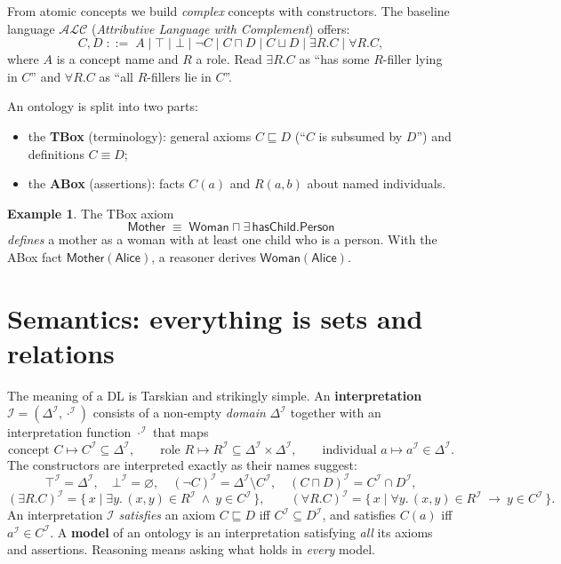 \documentclass[11pt]{article}
\newcommand{\I}{\mathcal{I}}                 %
\newcommand{\dom}{\Delta^{\I}}               %
\newcommand{\interp}[1]{#1^{\I}}             %
\newcommand{\concept}[1]{\ensuremath{\mathsf{#1}}}%
\newcommand{\role}[1]{\ensuremath{\mathsf{#1}}}   %
\newcommand{\dl}[1]{\ensuremath{\mathcal{#1}}}%
\newcommand{\sub}{\sqsubseteq}
\newcommand{\inter}{\sqcap}
\newcommand{\unin}{\sqcup}
\newcommand{\topc}{\top}
\newcommand{\botc}{\bot}
\theoremstyle{definition}
\newtheorem{example}{Example}
\begin{document}
From atomic concepts we build \emph{complex} concepts with constructors. The
baseline language \dl{ALC} (\emph{Attributive Language with Complement}) offers:
\[
  C, D \;::=\; A \mid \topc \mid \botc \mid \lnot C \mid C \inter D
          \mid C \unin D \mid \exists R.C \mid \forall R.C,
\]
where $A$ is a concept name and $R$ a role. Read $\exists R.C$ as ``has some
$R$-filler lying in $C$'' and $\forall R.C$ as ``all $R$-fillers lie in $C$''.

An ontology is split into two parts:
\begin{itemize}[nosep]
  \item the \textbf{TBox} (terminology): general axioms $C \sub D$ (``$C$ is
        subsumed by $D$'') and definitions $C \equiv D$;
  \item the \textbf{ABox} (assertions): facts $C(a)$ and $R(a,b)$ about named
        individuals.
\end{itemize}

\begin{example}
The TBox axiom
\[
  \concept{Mother} \;\equiv\; \concept{Woman} \inter \exists\,\role{hasChild}.\concept{Person}
\]
\emph{defines} a mother as a woman with at least one child who is a person.
With the ABox fact $\concept{Mother}(\concept{Alice})$, a reasoner derives
$\concept{Woman}(\concept{Alice})$.
\end{example}

\section{Semantics: everything is sets and relations}

The meaning of a DL is Tarskian and strikingly simple. An
\textbf{interpretation} $\I = (\dom, \cdot^{\I})$ consists of a non-empty
\emph{domain} $\dom$ together with an interpretation function $\cdot^{\I}$ that maps
\[
  \text{concept } C \mapsto \interp{C} \subseteq \dom, \qquad
  \text{role } R \mapsto \interp{R} \subseteq \dom \times \dom, \qquad
  \text{individual } a \mapsto \interp{a} \in \dom.
\]
The constructors are interpreted exactly as their names suggest:
\[
  \interp{\topc} = \dom, \quad \interp{\botc} = \varnothing, \quad
  \interp{(\lnot C)} = \dom \setminus \interp{C}, \quad
  \interp{(C \inter D)} = \interp{C} \cap \interp{D},
\]
\[
  \interp{(\exists R.C)} = \{\, x \mid \exists y.\, (x,y)\in\interp{R}
        \ \wedge\ y \in \interp{C} \,\}, \qquad
  \interp{(\forall R.C)} = \{\, x \mid \forall y.\, (x,y)\in\interp{R}
        \ \rightarrow\ y \in \interp{C} \,\}.
\]
An interpretation $\I$ \emph{satisfies} an axiom $C \sub D$ iff
$\interp{C} \subseteq \interp{D}$, and satisfies $C(a)$ iff
$\interp{a} \in \interp{C}$. A \textbf{model} of an ontology is an
interpretation satisfying \emph{all} its axioms and assertions. Reasoning means
asking what holds in \emph{every} model.
\end{document}
